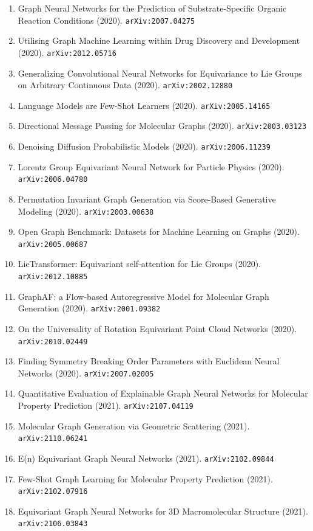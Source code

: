 \documentclass[11pt]{article}
\begin{document}
\begin{enumerate}
  \item Graph Neural Networks for the Prediction of Substrate-Specific Organic
  Reaction Conditions (2020). \texttt{arXiv:2007.04275}
  \item Utilising Graph Machine Learning within Drug Discovery and Development (2020). \texttt{arXiv:2012.05716}
  \item Generalizing Convolutional Neural Networks for Equivariance to Lie
  Groups on Arbitrary Continuous Data (2020). \texttt{arXiv:2002.12880}
  \item Language Models are Few-Shot Learners (2020). \texttt{arXiv:2005.14165}
  \item Directional Message Passing for Molecular Graphs (2020). \texttt{arXiv:2003.03123}
  \item Denoising Diffusion Probabilistic Models (2020). \texttt{arXiv:2006.11239}
  \item Lorentz Group Equivariant Neural Network for Particle Physics (2020). \texttt{arXiv:2006.04780}
  \item Permutation Invariant Graph Generation via Score-Based Generative
  Modeling (2020). \texttt{arXiv:2003.00638}
  \item Open Graph Benchmark: Datasets for Machine Learning on Graphs (2020). \texttt{arXiv:2005.00687}
  \item LieTransformer: Equivariant self-attention for Lie Groups (2020). \texttt{arXiv:2012.10885}
  \item GraphAF: a Flow-based Autoregressive Model for Molecular Graph
  Generation (2020). \texttt{arXiv:2001.09382}
  \item On the Universality of Rotation Equivariant Point Cloud Networks (2020). \texttt{arXiv:2010.02449}
  \item Finding Symmetry Breaking Order Parameters with Euclidean Neural
  Networks (2020). \texttt{arXiv:2007.02005}
  \item Quantitative Evaluation of Explainable Graph Neural Networks for
  Molecular Property Prediction (2021). \texttt{arXiv:2107.04119}
  \item Molecular Graph Generation via Geometric Scattering (2021). \texttt{arXiv:2110.06241}
  \item E(n) Equivariant Graph Neural Networks (2021). \texttt{arXiv:2102.09844}
  \item Few-Shot Graph Learning for Molecular Property Prediction (2021). \texttt{arXiv:2102.07916}
  \item Equivariant Graph Neural Networks for 3D Macromolecular Structure (2021). \texttt{arXiv:2106.03843}

\end{enumerate}
\end{document}
